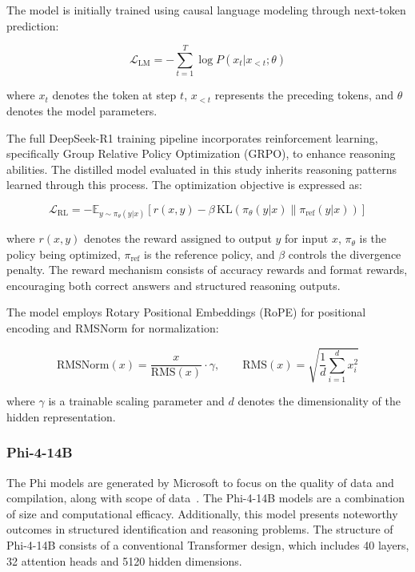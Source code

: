 \documentclass[10pt,letterpaper]{article}
\begin{document}
The model is initially trained using causal language modeling through next-token prediction:

\begin{equation}
\mathcal{L}_{\text{LM}} = -\sum_{t=1}^{T} \log P(x_t | x_{<t}; \theta)
\label{eq:lm_loss}
\end{equation}

where \(x_t\) denotes the token at step \(t\), \(x_{<t}\) represents the preceding tokens, and \(\theta\) denotes the model parameters.

The full DeepSeek-R1 training pipeline incorporates reinforcement learning, specifically Group Relative Policy Optimization (GRPO), to enhance reasoning abilities. The distilled model evaluated in this study inherits reasoning patterns learned through this process. The optimization objective is expressed as:

\begin{equation}
\mathcal{L}_{\text{RL}}
=
-\mathbb{E}_{y \sim \pi_\theta(y|x)}
\left[
r(x,y)
-
\beta
\,\mathrm{KL}
\left(
\pi_\theta(y|x)
\|
\pi_{\mathrm{ref}}(y|x)
\right)
\right]
\label{eq:rl_loss}
\end{equation}

where \(r(x,y)\) denotes the reward assigned to output \(y\) for input \(x\), \(\pi_\theta\) is the policy being optimized, \(\pi_{\mathrm{ref}}\) is the reference policy, and \(\beta\) controls the divergence penalty. The reward mechanism consists of accuracy rewards and format rewards, encouraging both correct answers and structured reasoning outputs.

The model employs Rotary Positional Embeddings (RoPE) for positional encoding and RMSNorm for normalization:

\begin{equation}
\text{RMSNorm}(x)
=
\frac{x}{\text{RMS}(x)}
\cdot \gamma,
\qquad
\text{RMS}(x)
=
\sqrt{\frac{1}{d}\sum_{i=1}^{d}x_i^2}
\label{eq:rmsnorm}
\end{equation}

where \(\gamma\) is a trainable scaling parameter and \(d\) denotes the dimensionality of the hidden representation.


\subsubsection*{Phi-4-14B}

The Phi models are generated by Microsoft to focus on the quality of data and compilation, along with scope of data~\cite{b39}. The Phi-4-14B models are a combination of size and computational efficacy. Additionally, this model presents noteworthy outcomes in structured identification and reasoning problems. The structure of Phi-4-14B consists of a conventional Transformer design, which includes 40 layers, 32 attention heads and 5120 hidden dimensions. 
\end{document}
